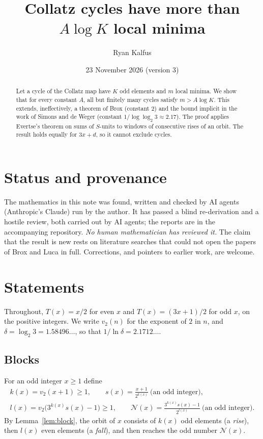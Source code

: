 \documentclass[11pt]{amsart}
\title[Collatz cycles and local minima]{Collatz cycles have more than $A\log K$ local minima}
\author{Ryan Kalfus}
\date{23 November 2026 (version 3)}
\theoremstyle{remark}
\newcommand{\vt}{v_2}
\newcommand{\N}{\mathcal{N}}
\begin{document}
\begin{abstract}
Let a cycle of the Collatz map have $K$ odd elements and $m$ local minima. We show that for
every constant $A$, all but finitely many cycles satisfy $m > A\log K$. This extends,
ineffectively, a theorem of Brox (constant $2$) and the bound implicit in the work of Simons
and de Weger (constant $1/\log\log_2 3 \approx 2.17$). The proof applies Evertse's theorem on
sums of $S$-units to windows of consecutive rises of an orbit. The result holds equally for
$3x+d$, so it cannot exclude cycles.
\end{abstract}

\maketitle

\section*{Status and provenance}

The mathematics in this note was found, written and checked by AI agents (Anthropic's
Claude) run by the author. It has passed a blind re-derivation and a hostile review, both
carried out by AI agents; the reports are in the accompanying repository. \emph{No human
mathematician has reviewed it.} The claim that the result is new rests on literature
searches that could not open the papers of Brox \cite{Brox} and Luca \cite{Luca} in full.
Corrections, and pointers to earlier work, are welcome.

\section{Statements}

Throughout, $T(x)=x/2$ for even $x$ and $T(x)=(3x+1)/2$ for odd $x$, on the positive
integers. We write $\vt(n)$ for the exponent of $2$ in $n$, and
$\delta=\log_2 3=1.58496\ldots$, so that $1/\ln\delta = 2.1712\ldots$.

\subsection*{Blocks}
For an odd integer $x\ge 1$ define
\begin{gather*}
k(x)=\vt(x+1)\ge 1,\qquad s(x)=\frac{x+1}{2^{k(x)}}\ \text{(an odd integer)},\\
l(x)=\vt\bigl(3^{k(x)}s(x)-1\bigr)\ge 1,\qquad
\N(x)=\frac{3^{k(x)}s(x)-1}{2^{l(x)}}\ \text{(an odd integer)}.
\end{gather*}
By Lemma~\ref{lem:block}, the orbit of $x$ consists of $k(x)$ odd elements (a \emph{rise}),
then $l(x)$ even elements (a \emph{fall}), and then reaches the odd number $\N(x)$.
\end{document}
